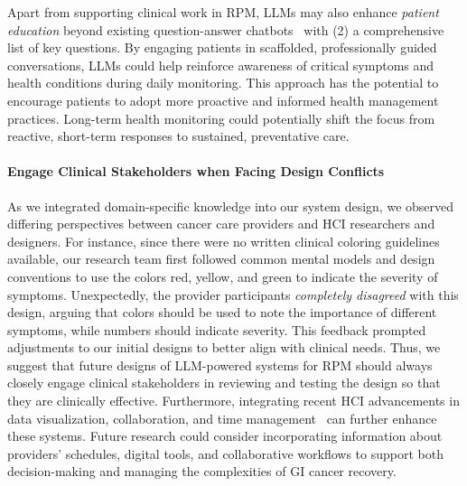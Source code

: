 Apart from supporting clinical work in RPM, LLMs may also enhance \textit{patient education} beyond existing question-answer chatbots~\cite{hao2024outlining} with (2) a comprehensive list of key questions. By engaging patients in scaffolded, professionally guided conversations, LLMs could help reinforce awareness of critical symptoms and health conditions during daily monitoring. This approach has the potential to encourage patients to adopt more proactive and informed health management practices. Long-term health monitoring could potentially shift the focus from reactive, short-term responses to sustained, preventative care.











\paragraph{Engage Clinical Stakeholders when Facing Design Conflicts}
As we integrated domain-specific knowledge into our system design, we observed differing perspectives between cancer care providers and HCI researchers and designers. For instance, since there were no written clinical coloring guidelines available, our research team first followed common mental models and design conventions to use the colors red, yellow, and green to indicate the severity of symptoms. Unexpectedly, the provider participants \textit{completely disagreed} with this design, arguing that colors should be used to note the importance of different symptoms, while numbers should indicate severity.
This feedback prompted adjustments to our initial designs to better align with clinical needs. 
Thus, we suggest that future designs of LLM-powered systems for RPM should always closely engage clinical stakeholders in reviewing and testing the design so that they are clinically effective. Furthermore, integrating recent HCI advancements in data visualization, collaboration, and time management~\cite{lin2024hevelius, branco2024co} can further enhance these systems. Future research could consider incorporating information about providers' schedules, digital tools, and collaborative workflows to support both decision-making and managing the complexities of GI cancer recovery. 




